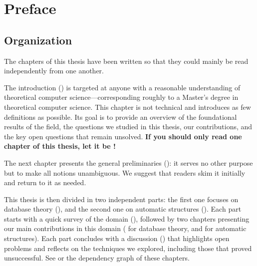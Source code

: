 \chapter*{Preface}

\section*{Organization}

The chapters of this thesis have been written so that they could mainly
be read independently from one another.

The introduction () is targeted at anyone with
a reasonable understanding of theoretical computer science---corresponding roughly
to a Master’s degree in theoretical computer science. This chapter is not technical and introduces as few definitions
as possible. Its goal is to provide an overview of the foundational results of the
field, the questions we studied in this thesis, our contributions,
and the key open questions that remain unsolved.
\textbf{If you should only read one chapter of this thesis, let it be !}

The next chapter presents the general preliminaries ():
it serves no other purpose but to make all notions unambiguous.
We suggest that readers skim it initially and return to it as needed.

This thesis is then divided in two independent parts:
the first one focuses on database theory (),
and the second one on automatic structures ().
Each part starts with a quick survey of the domain
(),
followed by two chapters presenting our main contributions in this domain
( for database theory,
and  for automatic structures).
Each part concludes with a discussion () that highlights open problems and reflects on the techniques we explored, including those that proved unsuccessful.
See  or the dependency graph of these chapters.

